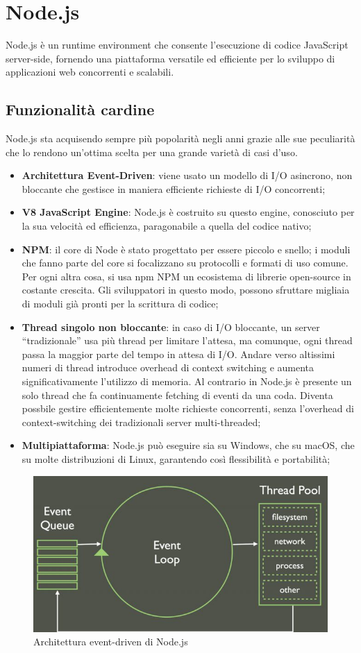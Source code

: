 \newpage


\newpage
\section{Node.js}
\label{sec:Node}
Node.js è un runtime environment che consente l'esecuzione di codice JavaScript server-side, fornendo una piattaforma versatile ed efficiente per lo sviluppo di applicazioni web concorrenti e scalabili.
\subsection{Funzionalità cardine}
Node.js sta acquisendo sempre più popolarità negli anni grazie alle sue peculiarità che lo rendono un'ottima scelta per una grande varietà di casi d'uso.
\begin{itemize}
        \item \textbf{Architettura Event-Driven}: viene usato un modello di I/O asincrono, non bloccante che gestisce in maniera efficiente richieste di I/O concorrenti;
        \item \textbf{V8 JavaScript Engine}: Node.js è costruito su questo engine, conosciuto per la sua velocità ed efficienza, paragonabile a quella del codice nativo;
        \item \textbf{NPM}: il core di Node è stato progettato per essere piccolo e snello; i moduli che fanno parte del core si focalizzano su protocolli e formati di uso comune. Per ogni altra cosa, si usa npm NPM un ecosistema di librerie open-source in costante crescita. Gli sviluppatori in questo modo, possono sfruttare migliaia di moduli già pronti per la scrittura di codice;
        \item \textbf{Thread singolo non bloccante}: in caso di I/O bloccante, un server “tradizionale” usa più thread per limitare l’attesa, ma comunque, ogni thread passa la maggior parte del tempo in attesa di I/O. Andare verso altissimi numeri di thread introduce overhead di context switching e aumenta significativamente l'utilizzo di memoria. Al contrario in Node.js è presente un solo thread che fa continuamente fetching di eventi da una coda. Diventa possbile gestire efficientemente molte richieste concorrenti, senza l'overhead di context-switching dei tradizionali server multi-threaded;
        \item \textbf{Multipiattaforma}: Node.js può eseguire sia su Windows, che su macOS, che su molte distribuzioni di Linux, garantendo così flessibilità e portabilità;
\end{itemize}
\newpage
\begin{figure}
        \begin{center}
                \includegraphics[width=0.47\columnwidth]{images/event-loop.jpeg}
        \end{center}
        \caption{Architettura event-driven di Node.js}
\end{figure}

